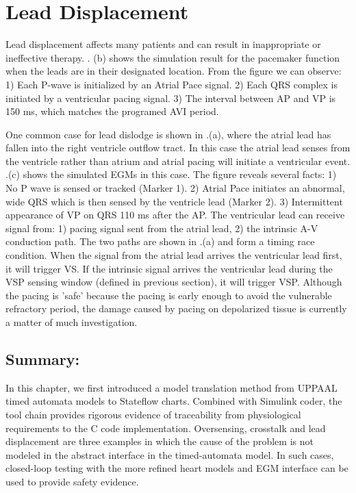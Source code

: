 \section{Lead Displacement}
Lead displacement affects many patients and can result in inappropriate or ineffective therapy. . (b) shows the simulation result for the pacemaker function when the leads are in their designated location. From the figure we can observe: 1) Each P-wave is initialized by an Atrial Pace signal. 2) Each QRS complex is initiated by a ventricular pacing signal. 3) The interval between AP and VP is 150 ms, which matches the programed AVI period.


One common case for lead dislodge is shown in .(a), where the atrial lead has fallen into the right ventricle outflow tract. In this case the atrial lead senses from the ventricle rather than atrium and atrial pacing will initiate a ventricular event. .(c) shows the simulated EGMs in this case. The figure reveals several facts: 1) No P wave is sensed or tracked (Marker 1). 2) Atrial Pace initiates an abnormal, wide QRS which is then sensed by the ventricle lead (Marker 2). 3) Intermittent appearance of VP on QRS 110 ms after the AP. The ventricular lead can receive signal from: 1) pacing signal sent from the atrial lead, 2) the intrinsic A-V conduction path. The two paths are shown in .(a) and form a timing race condition. When the signal from the atrial lead arrives the ventricular lead first, it will trigger VS. If the intrinsic signal arrives the ventricular lead during the VSP sensing window (defined in previous section), it will trigger VSP. Although the pacing is 'safe' because the pacing is early enough to avoid the vulnerable refractory period, the damage caused by pacing on depolarized tissue is currently a matter of much investigation.\\

\subsection{Summary:}
In this chapter, we first introduced a model translation method from UPPAAL timed automata models to Stateflow charts. Combined with Simulink coder, the tool chain provides rigorous evidence of traceability from physiological requirements to the C code implementation. Oversensing, crosstalk and lead displacement are three examples in which the cause of the problem is not modeled in the abstract interface in the timed-automata model. In such cases, closed-loop testing with the more refined heart models and EGM interface can be used to provide safety evidence.


